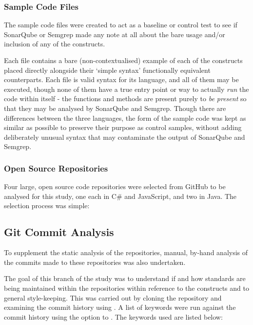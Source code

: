 \documentclass{article}
\begin{document}
        \subsubsection{Sample Code Files}
            The sample code files were created to act as a baseline or control test to see if SonarQube or Semgrep made any note at all about the bare usage and/or inclusion of any of the constructs.

            Each file contains a bare (non-contextualised) example of each of the constructs placed directly alongside their `simple syntax' functionally equivalent counterparts. Each file is valid syntax for its language, and all of them may be executed, though none of them have a true entry point or way to actually \emph{run} the code within itself - the functions and methods are present purely to \emph{be present} so that they may be analysed by SonarQube and Semgrep. Though there are differences between the three languages, the form of the sample code was kept as similar as possible to preserve their purpose as control samples, without adding deliberately unusual syntax that may contaminate the output of SonarQube and Semgrep.
        \subsubsection{Open Source Repositories}
            Four large, open source code repositories were selected from GitHub to be analysed for this study, one each in C\# and JavaScript, and two in Java. The selection process was simple: 
    \subsection{Git Commit Analysis}
        To supplement the static analysis of the repositories, manual, by-hand analysis of the commits made to these repositories was also undertaken.

        The goal of this branch of the study was to understand if and how standards are being maintained within the repositories within reference to the constructs and to general style-keeping. This was carried out by cloning the repository and examining the commit history using . A list of keywords were run against the commit history using the  option to . The keywords used are listed below:
        
\end{document}
